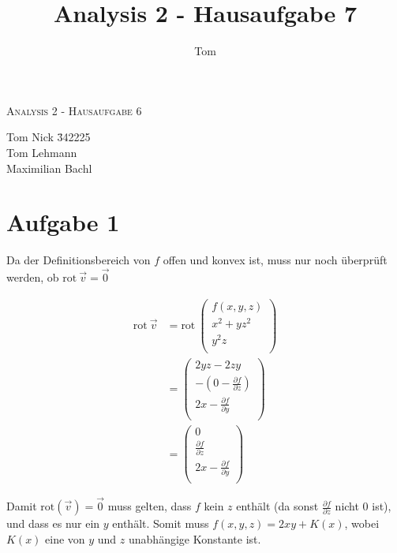 \documentclass[10pt,a4paper,parskip=half]{scrartcl}
\author{Tom}
\title{Analysis 2 - Hausaufgabe 7}
\newcommand{\vecthree}[3]{\begin{pmatrix}#1\\#2\\#3\\\end {pmatrix}}
\begin{document}
\begin{center}
\textsc{\Large{Analysis 2 - Hausaufgabe 6}} \\
\end{center}
\begin{tabbing}
Tom Nick \hspace{1.4cm}\= 342225\\
Tom Lehmann\\
Maximilian Bachl
\end{tabbing}
\section*{Aufgabe 1}
Da der Definitionsbereich von $f$ offen und konvex ist, muss nur noch überprüft werden, ob $\text{rot}\ \vec v = \vec 0$

\begin{align*}
\text{rot}\ \vec v &= \text{rot}\ \vecthree{f(x,y,z)}{x^2 + yz^2}{y^2z}\\
&= \vecthree{2yz - 2zy}{-(0-\frac{\partial f}{\partial z})}{2x - \frac{\partial f}{\partial y}}\\
&= \vecthree{0}{\frac{\partial f}{\partial z}}{2x - \frac{\partial f}{\partial y}}
\end{align*}

Damit $\text{rot}(\vec v) = \vec 0$ muss gelten, dass $f$ kein $z$ enthält (da sonst $\frac{\partial f}{\partial z}$ nicht 0 ist), und dass es nur ein $y$ enthält. Somit muss $f(x,y,z) = 2xy + K(x)$, wobei $K(x)$ eine von $y$ und $z$ unabhängige Konstante ist.
\end{document}

